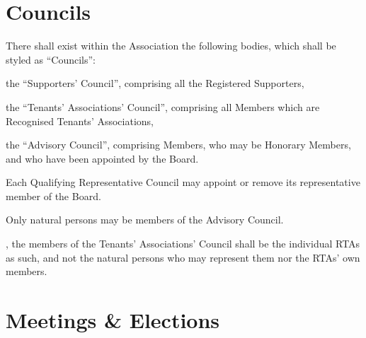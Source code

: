\documentclass[10pt]{mk-articles-of-association}
\newcommand{\EC}[0]{Board}
\newcommand{\RTA}[0]{Recognised Tenants' Association}
\begin{document}


\section{Councils}
\label{councils}
\begin{constenum}

\item There shall exist within the Association the following bodies, which
  shall be styled as ``Councils'':
  \begin{constenum}
  \item the ``Supporters' Council'', comprising all the Registered
    Supporters,
  \item the ``Tenants' Associations' Council'', comprising all Members
    which are \RTA{}s, \ITand
  \item the ``Advisory Council'', comprising Members, who may be
    Honorary Members, and who have been appointed by the
    \EC{}.\label{advcouncil}
  \end{constenum}

\item Each Qualifying Representative Council may
  appoint or remove its representative member of the \EC{}.
  \label{councilreps}

\item Only natural persons may be members of the Advisory Council.

\item \avoiddoubt, the members of the Tenants' Associations' Council
  shall be the individual RTAs as such, and not the natural persons
  who may represent them nor the RTAs' own members.

\end{constenum}



\section{Meetings \& Elections}
\end{document}
